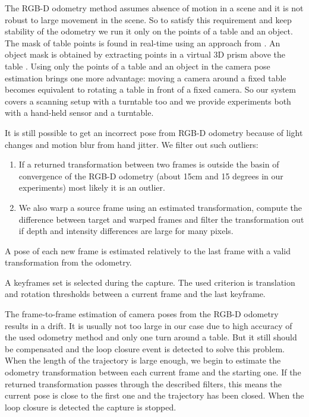 \documentclass[letterpaper, 10 pt, conference]{ieeeconf}  %
\begin{document}
The RGB-D odometry method assumes absence of motion in a scene and it is not
robust to large movement in the scene. So to satisfy this requirement
and keep stability of the odometry we run it only
on the points of a table and an object. The mask of table points
is found in real-time using an approach from \cite{poppinga2008fast}. An object mask is
obtained by extracting points in a virtual 3D prism above the table \cite{rusu2009detecting}.
Using only the points
of a table and an object in the camera pose estimation brings one more advantage:
moving a camera around a fixed table becomes equivalent to rotating
a table in front of a fixed camera. So our system covers a scanning setup with a turntable too
and we provide experiments both with a hand-held sensor and a turntable.

It is still possible to get an incorrect pose from RGB-D odometry
because of light changes and motion blur from hand jitter.
We filter out such outliers:

\begin{enumerate}
 \item If a returned transformation between two frames is outside the basin of convergence
 of the RGB-D odometry (about 15cm and 15 degrees in our experiments) most likely it is an outlier.
 \item We also warp a source frame using an estimated transformation,
 compute the difference between target and warped frames 
 and filter the transformation out if
 depth and intensity differences are large for many pixels.
\end{enumerate}

A pose of each new frame is estimated relatively to the last frame
with a valid transformation from the odometry.

A keyframes set is selected during the capture.
The used criterion is translation and rotation thresholds 
between a current frame and the last keyframe.

The frame-to-frame estimation of camera poses from the RGB-D 
odometry results in a drift. It is usually not too large in our case
due to high accuracy of the used odometry method \cite{steinbrucker2011real}
and only one turn around a table.
But it still should be compensated and the loop closure event is detected to solve this problem.
When the length of the trajectory is large enough, we begin to estimate the
odometry transformation between each current frame and the starting one. 
If the returned transformation passes through the described filters, 
this means the current pose is close to the first one and 
the trajectory has been closed. When the loop closure is detected 
the capture is stopped.
\end{document}
